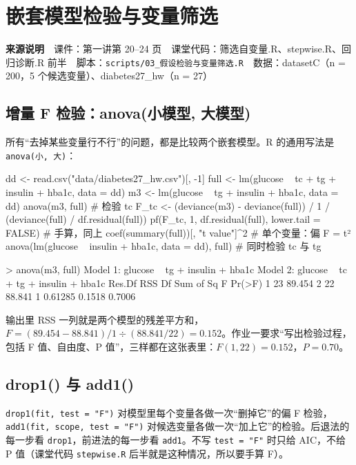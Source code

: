 \chapter{嵌套模型检验与变量筛选}

\begin{studysource}
\textbf{来源说明}　课件：第一讲第 20–24 页　课堂代码：筛选自变量.R、stepwise.R、回归诊断.R 前半　脚本：\texttt{scripts/03\_假设检验与变量筛选.R}　数据：datasetC（n = 200，5 个候选变量）、diabetes27\_hw（n = 27）
\end{studysource}


\section{增量 F 检验：anova(小模型, 大模型)}
所有“去掉某些变量行不行”的问题，都是比较两个嵌套模型。R 的通用写法是 \Verb|anova(小, 大)|：

\begin{rcode}[R · 偏 F 检验]
dd   <- read.csv("data/diabetes27_hw.csv")[, -1]
full <- lm(glucose ~ tc + tg + insulin + hba1c, data = dd)
m3   <- lm(glucose ~ tg + insulin + hba1c, data = dd)
anova(m3, full)                                       # 检验 tc
F_tc <- (deviance(m3) - deviance(full)) / 1 / (deviance(full) / df.residual(full))
pf(F_tc, 1, df.residual(full), lower.tail = FALSE)    # 手算，同上
coef(summary(full))[, "t value"]^2                    # 单个变量：偏 F = t²
anova(lm(glucose ~ insulin + hba1c, data = dd), full) # 同时检验 tc 与 tg
\end{rcode}
\begin{routput}
> anova(m3, full)
Model 1: glucose ~ tg + insulin + hba1c
Model 2: glucose ~ tc + tg + insulin + hba1c
  Res.Df    RSS Df Sum of Sq      F Pr(>F)
1     23 89.454
2     22 88.841  1   0.61285 0.1518 0.7006
\end{routput}
输出里 RSS 一列就是两个模型的残差平方和，$F=(89.454-88.841)/1\div(88.841/22)=0.152$。作业一要求“写出检验过程，包括 F 值、自由度、P 值”，三样都在这张表里：$F(1,22)=0.152$，$P=0.70$。

\section{drop1() 与 add1()}
\Verb|drop1(fit, test = "F")| 对模型里每个变量各做一次“删掉它”的偏 F 检验，\Verb|add1(fit, scope, test = "F")| 对候选变量各做一次“加上它”的检验。后退法的每一步看 \Verb|drop1|，前进法的每一步看 \Verb|add1|。不写 \Verb|test = "F"| 时只给 AIC，不给 P 值（课堂代码 \Verb|stepwise.R| 后半就是这种情况，所以要手算 F）。

